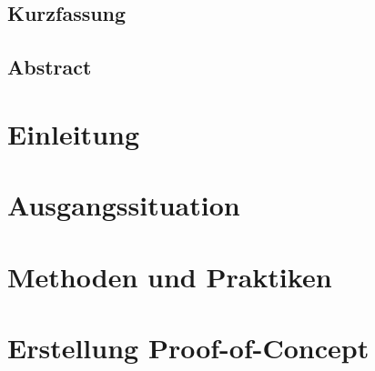 \documentclass[oneside, ngerman, final, 11pt, a4paper, 1.1headlines, headinclude=false, footinclude=false, mpinclude=false, pagesize, onecolumn, titlepage, parskip=half, headsepline, chapterprefix=false, version=first, listof=totoc, bibliography=totoc, toc=graduated, fleqn, twoside=false]{scrbook}
\begin{document}
	\newpage{}
	
	\section*{\thispagestyle{empty}Kurzfassung}
	\textit{\lipsum[1-4]}
	
	\newpage{}
	
	\section*{\thispagestyle{empty}Abstract}
	\textit{\lipsum[1-4]}
	
	\newpage{}
	
	\setcounter{page}{1}
	
	\tableofcontents{}
	
	\newpage{}
	
	\setcounter{page}{1} 
	
	\chapter{Einleitung}
	
	
	\chapter{Ausgangssituation}
	
	
	\chapter{Methoden und Praktiken}
	\label{chap:methoden-und-praktiken}
	
	
	\chapter{Erstellung Proof-of-Concept}
	
	
\end{document}
